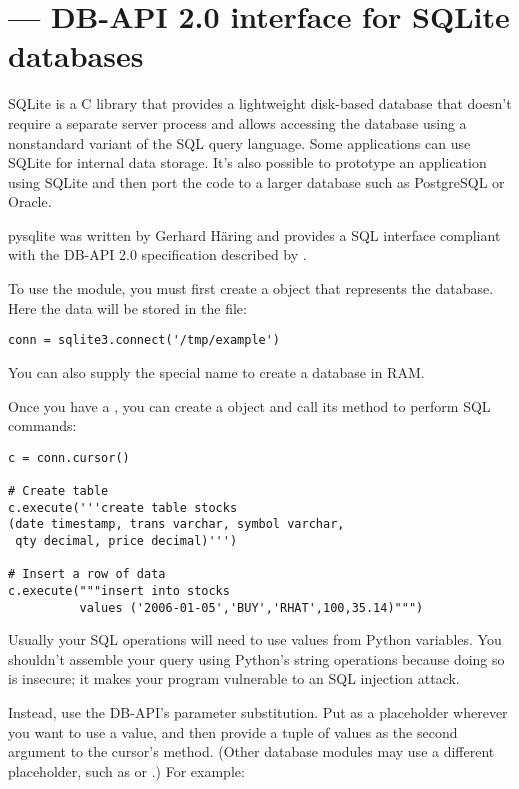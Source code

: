 \section{ ---
         DB-API 2.0 interface for SQLite databases}


SQLite is a C library that provides a lightweight disk-based database
that doesn't require a separate server process and allows accessing
the database using a nonstandard variant of the SQL query language.
Some applications can use SQLite for internal data storage.  It's also
possible to prototype an application using SQLite and then port the
code to a larger database such as PostgreSQL or Oracle.
 
pysqlite was written by Gerhard H\"aring and provides a SQL interface
compliant with the DB-API 2.0 specification described by
. 

To use the module, you must first create a  object
that represents the database.  Here the data will be stored in the 
 file:

\begin{verbatim}
conn = sqlite3.connect('/tmp/example')
\end{verbatim}

You can also supply the special name  to create
a database in RAM.

Once you have a , you can create a  
object and call its  method to perform SQL commands:

\begin{verbatim}
c = conn.cursor()

# Create table
c.execute('''create table stocks
(date timestamp, trans varchar, symbol varchar,
 qty decimal, price decimal)''')

# Insert a row of data
c.execute("""insert into stocks
          values ('2006-01-05','BUY','RHAT',100,35.14)""")
\end{verbatim}    

Usually your SQL operations will need to use values from Python
variables.  You shouldn't assemble your query using Python's string
operations because doing so is insecure; it makes your program
vulnerable to an SQL injection attack.  

Instead, use the DB-API's parameter substitution.  Put  as a
placeholder wherever you want to use a value, and then provide a tuple
of values as the second argument to the cursor's 
method.  (Other database modules may use a different placeholder,
such as  or .) For example:

